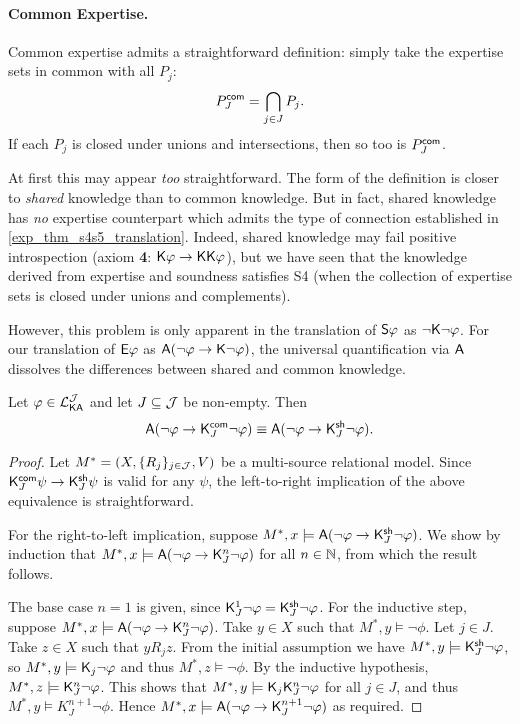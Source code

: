 \paragraph{Common Expertise.}

Common expertise admits a straightforward definition: simply take the expertise
sets in common with all $P_j$:
\[
\Pcommon_J = \bigcap_{j \in J}{P_j}.\]
If each $P_j$ is closed under unions and intersections, then so too is
$\Pcommon_J$.

At first this may appear \emph{too} straightforward. The form of the definition
is closer to \emph{shared} knowledge than to common knowledge. But in fact,
shared knowledge has \emph{no} expertise counterpart which admits the type of
connection established in \cref{exp_thm_s4s5_translation}. Indeed, shared knowledge
may fail positive introspection (axiom \textbf{4}: $\K\phi \limplies
\K\K\phi$), but we have seen that the knowledge derived from expertise and
soundness satisfies S4 (when the collection of expertise sets is closed under
unions and complements).

However, this problem is only apparent in the translation of $\S\phi$ as
$\neg\K\neg\phi$. For our translation of $\E\phi$ as $\A(\neg\phi \limplies
\K\neg\phi)$, the universal quantification via $\A$ dissolves the differences
between shared and common knowledge.

\begin{proposition}
\label{exp_prop_shared_common_collapse}
Let $\phi \in \cLKAJ$ and let $J \subseteq \J$ be non-empty.
Then
\[
\A(\neg\phi \limplies \Kcommon_J\neg\phi)
\equiv
\A(\neg\phi \limplies \Kshared_J\neg\phi).\]
\end{proposition}

\begin{proof}

Let $M^* = (X, \{R_j\}_{j \in \J}, V)$ be a multi-source relational
model. Since $\Kcommon_J\psi \limplies \Kshared_J\psi$ is valid for
any $\psi$, the left-to-right implication of the above equivalence
is straightforward.

For the right-to-left implication, suppose $M^*, x \models
\A(\neg\phi \limplies \Kshared_J\neg\phi)$. We show by induction that
$M^*, x \models \A(\neg\phi \limplies \K_J^n\neg\phi)$ for all
$n \in \N$, from which the result follows.

The base case $n = 1$ is given, since $\K_J^1\neg\phi =
\Kshared_J\neg\phi$. For the inductive step, suppose $M^*, x
\models \A(\neg\phi \limplies \K_J^n\neg\phi)$. Take $y \in X$ such
that $M^*, y \models \neg\phi$. Let $j \in J$. Take $z
\in X$ such that $y{R_j}z$. From the initial assumption we have
$M^*, y \models \Kshared_J\neg\phi$, so $M^*, y \models
\K_j\neg\phi$ and thus $M^*, z \models \neg\phi$. By the inductive
hypothesis, $M^*, z \models \K_J^n\neg\phi$. This shows that
$M^*, y \models \K_j\K_J^n\neg\phi$ for all $j \in J$, and
thus $M^*, y \models K^{n+1}_J\neg\phi$. Hence $M^*, x
\models \A(\neg\phi \limplies \K^{n+1}_J\neg\phi)$ as required.
\end{proof}

